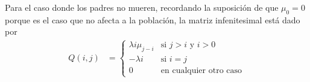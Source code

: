 Para el caso donde los padres no mueren, recordando la suposición de que $\mu_0 = 0$ porque es el caso que no afecta a la población,
la matriz infenitesimal está dado por
\begin{align}
        Q(i,j)  &=
                \begin{cases}
                    \lambda i \mu_{j-i}     &    \text{si $j > i$ y $i > 0$} \\
                    -\lambda i              &    \text{si $i = j$}                   \\
                    0                       &    \text{en cualquier otro caso}
                \end{cases}
\end{align}
